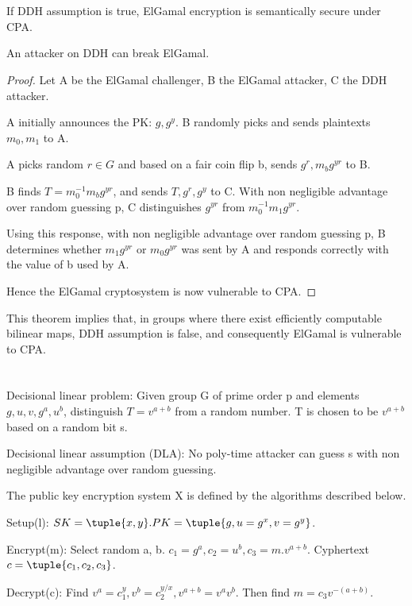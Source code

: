 \documentclass[10pt]{amsart}
\begin{document}
\section{}
\begin{fact}
 If DDH assumption is true, ElGamal encryption is semantically secure under CPA.
\end{fact}
\begin{thm}
 An attacker on DDH can break ElGamal.
\end{thm}
\begin{proof}
Let A be the ElGamal challenger, B the ElGamal attacker, C the DDH attacker.

A initially announces the PK: $g, g^{y}$. B randomly picks and sends plaintexts $m_{0}, m_{1}$ to A.

A picks random $r \in G$ and based on a fair coin flip b, sends $g^{r}, m_{b}g^{yr}$ to B.

B finds $T = m_{0}^{-1}m_{b}g^{yr}$, and sends $T, g^{r}, g^{y}$ to C. With non negligible advantage over random guessing p, C distinguishes $g^{yr}$ from $m_{0}^{-1}m_{1}g^{yr}$.

Using this response, with non negligible advantage over random guessing p, B determines whether $m_{1}g^{yr}$ or $m_{0}g^{yr}$ was sent by A and responds correctly with the value of b used by A.

Hence the ElGamal cryptosystem is now vulnerable to CPA.
\end{proof}


\begin{rem}
This theorem implies that, in groups where there exist efficiently computable bilinear maps, DDH assumption is false, and consequently ElGamal is vulnerable to CPA.
\end{rem}


\section{}
\begin{rem}
Decisional linear problem: Given group G of prime order p and elements $g, u, v, g^{a}, u^{b}$, distinguish $T = v^{a+b}$ from a random number. T is chosen to be $v^{a+b}$ based on a random bit s.

Decisional linear assumption (DLA): No poly-time attacker can guess s with non negligible advantage over random guessing.
\end{rem}

\begin{defn}
The public key encryption system X is defined by the algorithms described below.

Setup(l): $SK = \tuple{x, y}. PK = \tuple{g, u = g^{x}, v = g^{y}}$.

Encrypt(m): Select random a, b. $c_{1} = g^{a}, c_{2} = u^{b}, c_{3} = m.v^{a+b}$. Cyphertext $c = \tuple{c_{1}, c_{2}, c_{3}}$.

Decrypt(c): Find $v^{a} = c_{1}^{y}, v^{b} = c_{2}^{y/x}, v^{a+b} = v^{a}v^{b}$. Then find $m = c_{3}v^{-(a+b)}$.

\end{defn}
\end{document}
